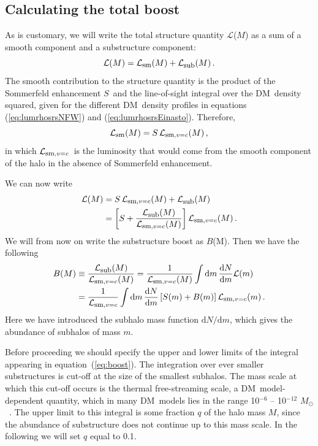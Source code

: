 \documentclass[aps,prd,twocolumn,amsmath,amssymb,floatfix,nofootinbib,10pt]{revtex4}
\newcommand{\DM}{DM}
\newcommand{\somm}{\ensuremath{S}}
\newcommand{\dd}{\mathrm{d}}
\newcommand{\eqnname}{equation}
\newcommand{\lum}{\ensuremath{\mathcal{L}}}
\newcommand{\lumsmooth}{\ensuremath{\lum_{\mbox{{\footnotesize sm}}}}}
\newcommand{\lumsmoothc}{\ensuremath{\lum_{\mbox{{\footnotesize sm}},v=c}}}
\newcommand{\lumsub}{\ensuremath{\lum_{\mbox{{\footnotesize sub}}}}}
\newcommand{\boost}{\ensuremath{B}}
\newcommand{\Msol}{\ensuremath{M_{\odot}}}
\begin{document}
\subsection{Calculating the total boost}

As is customary, we will write the total structure quantity \lum($M$) as a
sum of a smooth component and a substructure component:
\begin{equation}
\lum(M) = \lumsmooth(M) + \lumsub(M)\, .
\end{equation}
The smooth contribution to the structure quantity is the product of
the Sommerfeld enhancement \somm\ and the line-of-sight integral over
the \DM\ density squared, given for the different \DM\ density
profiles in \eqnname s (\ref{eq:lumrhosrsNFW}) and
(\ref{eq:lumrhosrsEinasto}). Therefore,
\begin{equation}
\lumsmooth(M) = \somm \, \lumsmoothc(M)\, ,
\end{equation}
in which \lumsmoothc\ is the luminosity that would come from the
smooth component of the halo in the absence of Sommerfeld enhancement.

We can now write
\begin{equation}\label{eq:totboost}
\begin{split}
\lum(M) & = \somm\,\lumsmoothc(M) + \lumsub(M)\\
&= \left[ \somm + \frac{\lumsub(M)}{\lumsmoothc(M)}\right] \lumsmoothc(M)\, .
\end{split}
\end{equation}
We will from now on write the substructure boost as \boost(M). Then we
have the following
\begin{equation}\label{eq:boost}
\begin{split}
\boost(M) & \equiv \frac{\lumsub(M)}{\lumsmoothc(M)} = \frac{1}{\lumsmoothc(M)} \int \dd m \, \frac{\dd N}{\dd m} \lum(m)\\
&= \frac{1}{\lumsmoothc} \int \dd m\, \frac{\dd N}{\dd m} \left[ \somm(m) + \boost(m) \right] \lumsmoothc(m)\, .
\end{split}
\end{equation}
Here we have introduced the subhalo mass function $\dd N/\dd m$, which
gives the abundance of subhalos of mass $m$.

Before proceeding we should specify the upper and lower limits of the
integral appearing in \eqnname\ (\ref{eq:boost}). The integration over
ever smaller substructures is cut-off at the size of the smallest
subhalos. The mass scale at which this cut-off occurs is the thermal
free-streaming scale, a \DM\ model-dependent quantity, which in many
\DM\ models lies in the range 10$^{-6}$ -- 10$^{-12}$ \Msol\
\cite{1999PhRvD..59d3517S,2001PhRvD..64h3507H,2004MNRAS.353L..23G,2005PhRvD..71j3520L,2006PhRvL..97c1301P}. The
upper limit to this integral is some fraction $q$ of the halo mass
$M$, since the abundance of substructure does not continue up to this
mass scale. In the following we will set $q$ equal to 0.1.
\end{document}

